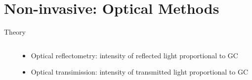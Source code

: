 \documentclass[fontsize=11pt,aspectratio=169,t,fleqn]{beamer}
\begin{document}
\section{Non-invasive: Optical Methods}
\begin{frame}{Theory}
    \begin{columns}[t]
      \begin{column}{.45\textwidth}
      \end{column}
      \begin{column}{.5\textwidth}
        \begin{itemize}
          \item Optical reflectometry: intensity of reflected light proportional to GC
          \item Optical transimission: intensity of transmitted light proportional to GC
          
        \end{itemize}
      \end{column}
    \end{columns}
\end{frame}
\end{document}

